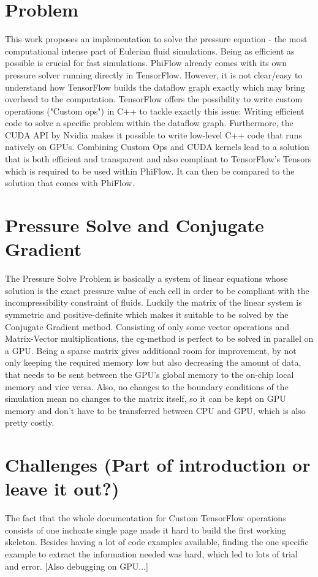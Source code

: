 \section{Problem}
This work proposes an implementation to solve the pressure equation - the most computational intense part of Eulerian fluid simulations. Being as efficient as possible is crucial for fast simulations. PhiFlow already comes with its own pressure solver running directly in TensorFlow. However, it is not clear/easy to understand how TensorFlow builds the dataflow graph exactly which may bring overhead to the computation. TensorFlow offers the possibility to write custom operations ("Custom ops") in C++ to tackle exactly this issue: Writing efficient code to solve a specific problem within the dataflow graph. Furthermore, the CUDA API by Nvidia makes it possible to write low-level C++ code that runs natively on GPUs. Combining Custom Ops and CUDA kernels lead to a solution that is both efficient and transparent and also compliant to TensorFlow's Tensors which is required to be used within PhiFlow. It can then be compared to the solution that comes with PhiFlow.
\section{Pressure Solve and Conjugate Gradient}
The Pressure Solve Problem is basically a system of linear equations whose solution is the exact pressure value of each cell in order to be compliant with the incompressibility constraint of fluids. Luckily the matrix of the linear system is symmetric and positive-definite which makes it suitable to be solved by the Conjugate Gradient method. Consisting of only some vector operations and Matrix-Vector multiplications, the cg-method is perfect to be solved in parallel on a GPU. Being a sparse matrix gives additional room for improvement, by not only keeping the required memory low but also decreasing the amount of data, that needs to be sent between the GPU's global memory to the on-chip local memory and vice versa. Also, no changes to the boundary conditions of the simulation mean no changes to the matrix itself, so it can be kept on GPU memory and don't have to be transferred between CPU and GPU, which is also pretty costly. 
\section{Challenges (Part of introduction or leave it out?)}
The fact that the whole documentation for Custom TensorFlow operations consists of one inchoate single page made it hard to build the first working skeleton. Besides having a lot of code examples available, finding the one specific example to extract the information needed was hard, which led to lots of trial and error. [Also debugging on GPU...]
